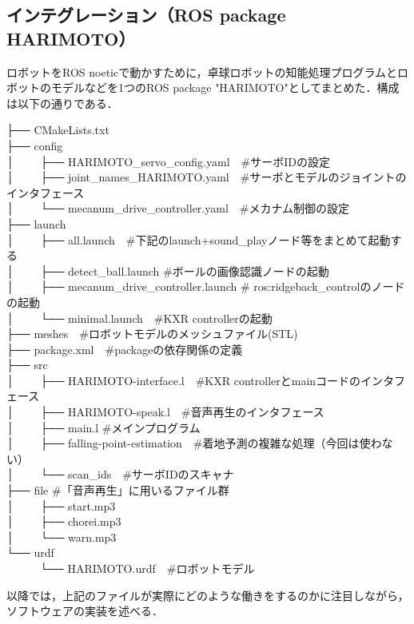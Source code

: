\documentclass[10pt, oneside, titlepage]{ltjarticle}  %
\begin{document}
  \subsection{インテグレーション（ROS package HARIMOTO）}
  ロボットをROS noeticで動かすために，卓球ロボットの知能処理プログラムとロボットのモデルなどを1つのROS package "HARIMOTO"としてまとめた．構成は以下の通りである．
  \begin{screen}
  ├── CMakeLists.txt \\
  ├── config \\
  │　　 ├── HARIMOTO\_servo\_config.yaml　\#サーボIDの設定 \\
  │　　 ├── joint\_names\_HARIMOTO.yaml　\#サーボとモデルのジョイントのインタフェース \\
  │　　 └── mecanum\_drive\_controller.yaml　\#メカナム制御の設定 \\
  ├── launch \\
  │　　 ├── all.launch　\#下記のlaunch+sound\_playノード等をまとめて起動する \\
  │　　 ├── detect\_ball.launch \#ボールの画像認識ノードの起動 \\
  │　　 ├── mecanum\_drive\_controller.launch \# ros:ridgeback\_controlのノードの起動 \\
  │　　 └── minimal.launch　\#KXR controllerの起動 \\
  ├── meshes　\#ロボットモデルのメッシュファイル(STL) \\
  ├── package.xml　\#packageの依存関係の定義 \\
  ├── src \\
  │　　 ├── HARIMOTO-interface.l　\#KXR controllerとmainコードのインタフェース \\
  │　　 ├── HARIMOTO-speak.l　\#音声再生のインタフェース  \\
  │　　 ├── main.l \#メインプログラム  \\
  │　　 ├── falling-point-estimation　\#着地予測の複雑な処理（今回は使わない）  \\
  │　　 └── scan\_ids　\#サーボIDのスキャナ \\ 
  ├── file \#「音声再生」に用いるファイル群 \\
  │　　 ├── start.mp3 \\
  │　　 ├── chorei.mp3 \\
  │　　 └── warn.mp3 \\
  └── urdf \\
  　　　└── HARIMOTO.urdf　\#ロボットモデル
  \end{screen}
  以降では，上記のファイルが実際にどのような働きをするのかに注目しながら，ソフトウェアの実装を述べる．
\end{document}
